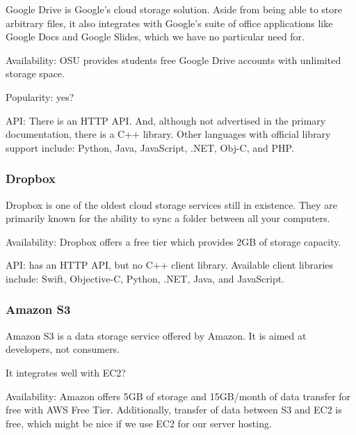 \documentclass[onecolumn, draftclsnofoot,10pt, compsoc]{IEEEtran}
\begin{document}
Google Drive is Google's cloud storage solution. Aside from being able to store arbitrary files, it also integrates with Google's suite of office applications like Google Docs and Google Slides, which we have no particular need for.

Availability: OSU provides students free Google Drive accounts with unlimited storage space.

Popularity: yes?

API: There is an HTTP API.
And, although not advertised in the primary documentation, there is a C++ library. \cite{drivecpp}
Other languages with official library support include:  Python, Java, JavaScript, .NET, Obj-C, and PHP.
\cite{driveapi}

\subsubsection{ Dropbox }

Dropbox \cite{dropbox} is one of the oldest cloud storage services still in existence. They are primarily known for the ability to sync a folder between all your computers.

Availability: Dropbox offers a free tier which provides 2GB of storage capacity.
\cite{dropboxplans}

API: has an HTTP API,
\cite{dropboxapi}
but no C++ client library.
Available client libraries include:
Swift, Objective-C, Python, .NET, Java, and JavaScript.




\subsubsection{ Amazon S3 }

Amazon S3 \cite{s3} is a data storage service offered by Amazon. It is aimed at developers, not consumers.

It integrates well with EC2?

Availability: Amazon offers 5GB of storage and 15GB/month of data transfer for free with AWS Free Tier. \cite{s3-pricing} Additionally, transfer of data between S3 and EC2 is free, which might be nice if we use EC2 for our server hosting.
\end{document}
